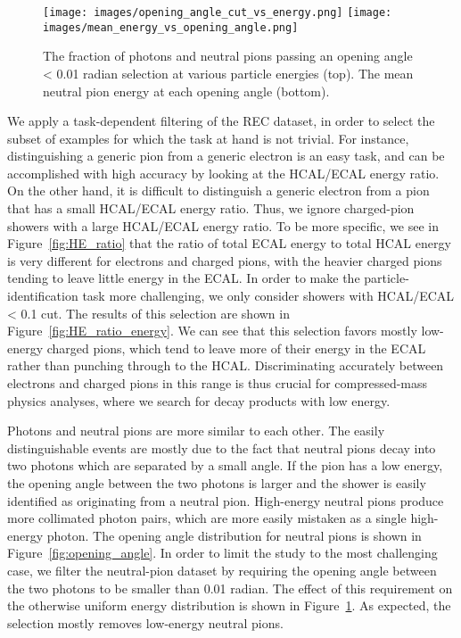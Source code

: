 \begin{figure}[htbp]
\centering
\texttt{[image: images/opening\_angle\_cut\_vs\_energy.png]}
\texttt{[image: images/mean\_energy\_vs\_opening\_angle.png]}
\caption{The fraction of photons and neutral pions passing an opening angle < 0.01 radian selection at various particle energies (top). The mean neutral pion energy at each opening angle (bottom).}
\label{fig:opening_angle_energy}
\end{figure}

We apply a task-dependent filtering of the REC dataset, in order to select the subset of examples for which the task at hand is not trivial. For instance, distinguishing a generic pion from a generic electron is an easy task, and can be accomplished with high accuracy by looking at the HCAL/ECAL energy ratio. On the other hand, it is difficult to distinguish a generic electron from a pion that has a small HCAL/ECAL energy ratio. Thus, we ignore charged-pion showers with a large HCAL/ECAL energy ratio. To be more specific, we see in Figure~\ref{fig:HE_ratio} that the ratio of total ECAL energy to total HCAL energy is very different for electrons and charged pions, with the heavier charged pions tending to leave little energy in the ECAL. In order to make the particle-identification task more challenging, we only consider showers with HCAL/ECAL < 0.1 cut. The results of this selection are shown in Figure~\ref{fig:HE_ratio_energy}. We can see that this selection favors mostly low-energy charged pions, which tend to leave more of their energy in the ECAL rather than punching through to the HCAL. Discriminating accurately between electrons and charged pions in this range is thus crucial for compressed-mass physics analyses, where we search for decay products with low energy.

Photons and neutral pions are more similar to each other. The easily distinguishable events are mostly due to the fact that neutral pions decay into two photons which are separated by a small angle. If the pion has a low energy, the opening angle between the two photons is larger and the shower is easily identified as originating from a neutral pion. High-energy neutral pions produce more collimated photon pairs, which are more easily mistaken as a single high-energy photon. The opening angle distribution for neutral pions is shown in Figure~\ref{fig:opening_angle}. In order to limit the study to the most challenging case, we filter the neutral-pion dataset by requiring the opening angle between the two photons to be smaller than 0.01 radian.  The effect of  this requirement on the otherwise uniform energy distribution is shown in Figure~\ref{fig:opening_angle_energy}. As expected, the selection mostly removes low-energy neutral pions. 

